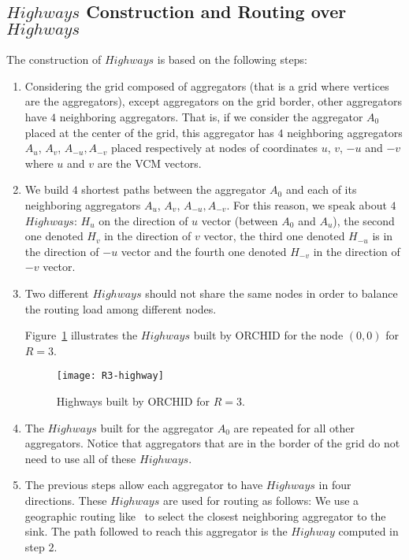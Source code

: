 \subsection{$Highways$ Construction and Routing over $Highways$}\label{sec:highCon}


The construction of $Highways$ is based on the following steps:


\begin{enumerate}
\item Considering the grid composed of aggregators (that is a grid where vertices are the aggregators), except aggregators on the grid border, other aggregators have $4$ neighboring aggregators. That is, if we consider the aggregator $A_0$ placed at the center of the grid, this aggregator has $4$ neighboring aggregators $A_u$, $A_v$, $A_{-u}, A_{-v}$ placed respectively at nodes of coordinates $u$, $v$, $-u$ and $-v$ where $u$ and $v$ are the VCM vectors. 
\item We build $4$ shortest paths between the aggregator $A_0$ and each of its neighboring aggregators $A_u$, $A_v$, $A_{-u}, A_{-v}$. For this reason, we speak about $4$ $Highways$: $H_u$ on the direction of $u$ vector (between $A_0$ and $A_u$), the second one denoted $H_v$ in the direction of $v$ vector, the third one denoted $H_{-u}$ is in the direction of $-u$ vector and the fourth one denoted $H_{-v}$ in the direction of $-v$ vector.
\item Two different $Highways$ should not share the same nodes in order to balance the routing load among different nodes.

Figure~\ref{fig:highway-R3} illustrates the $Highways$ built by ORCHID for the node $(0,0)$ for $R=3$.

\begin{figure}[h!]
\centering
\texttt{[image: R3-highway]}
\caption{Highways built by ORCHID for $R=3$.
\label{fig:highway-R3}}
\end{figure}

\item The $Highways$ built for the aggregator $A_0$ are repeated for all other aggregators. Notice that aggregators that are in the border of the grid do not need to use all of these $Highways$.
\item The previous steps allow each aggregator to have $Highways$ in four directions. These $Highways$ are used for routing as follows: We use a geographic routing like~\cite{geoRou} to select the closest neighboring aggregator to the sink. The path followed to reach this aggregator is the $Highway$ computed in step $2$.
\end{enumerate}

